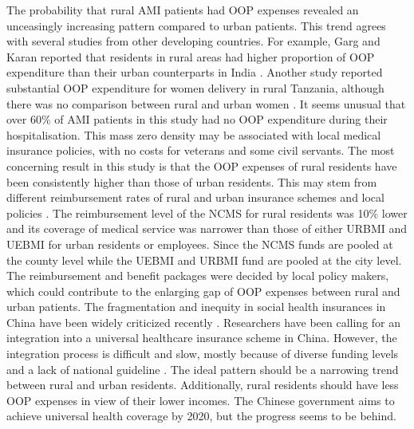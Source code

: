 \documentclass[ijerph,article,submit,moreauthors,pdftex,10pt,a4paper]{mdpi}
\theoremstyle{mdpi}
\newcounter{ex}
\newcounter{re}
\theoremstyle{mdpidefinition}
\begin{document}
The probability that rural AMI patients had OOP expenses revealed an unceasingly increasing pattern compared to urban patients. This trend agrees with several studies from other developing countries. For example, Garg and Karan reported that residents in rural areas had higher proportion of OOP expenditure than their urban counterparts in India \cite{garg2008reducing}. Another study reported substantial OOP expenditure for women delivery in rural Tanzania, although there was no comparison between rural and urban women \cite{kruk2008user}. It seems unusual that over 60\% of AMI patients in this study had no OOP expenditure during their hospitalisation. This mass zero density may be associated with local medical insurance policies, with no costs for veterans and some civil servants. The most concerning result in this study is that the OOP expenses of rural residents have been consistently higher than those of urban residents. This may stem from different reimbursement rates of rural and urban insurance schemes and local policies \cite{lin2017insurance, meng2015consolidating}. The reimbursement level of the NCMS for rural residents was 10\% lower and its coverage of medical service was narrower than those of either URBMI and UEBMI for urban residents or employees\cite{meng2015consolidating}. Since the NCMS funds are pooled at the county level while the UEBMI and URBMI fund are pooled at the city level. The reimbursement and benefit packages were decided by local policy makers, which could contribute to the enlarging gap of OOP expenses between rural and urban patients. The fragmentation and inequity in social health insurances in China have been widely criticized recently \cite{meng2015consolidating,wang2012integration, wang2014integration}. Researchers have been calling for an integration into a universal healthcare insurance scheme in China. However, the integration process is difficult and slow, mostly because of diverse funding levels and a lack of national guideline \cite{meng2015consolidating}. The ideal pattern should be a narrowing trend between rural and urban residents. Additionally, rural residents should have less OOP expenses in view of their lower incomes. The Chinese government aims to achieve universal health coverage by 2020, but the progress seems to be behind.
\end{document}
